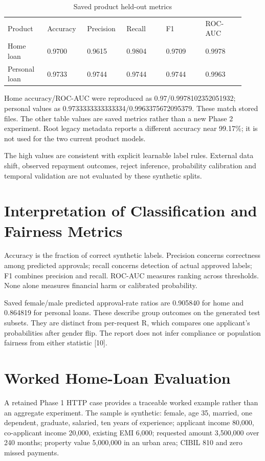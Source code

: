 \documentclass[12pt,a4paper]{report}
\begin{document}
\begin{longtable}{p{0.153\linewidth}p{0.153\linewidth}p{0.153\linewidth}p{0.153\linewidth}p{0.153\linewidth}p{0.153\linewidth}}
\caption{Saved product held-out metrics}\\

Product & Accuracy & Precision & Recall & F1 & ROC-AUC\\
Home loan & 0.9700 & 0.9615 & 0.9804 & 0.9709 & 0.9978\\
Personal loan & 0.9733 & 0.9744 & 0.9744 & 0.9744 & 0.9963\\
\end{longtable}
Home accuracy/ROC-AUC were reproduced as 0.97/0.9978102352051932; personal values as 0.9733333333333334/0.9963375672095379. These match stored files. The other table values are saved metrics rather than a new Phase 2 experiment. Root legacy metadata reports a different accuracy near 99.17\%; it is not used for the two current product models.

The high values are consistent with explicit learnable label rules. External data shift, observed repayment outcomes, reject inference, probability calibration and temporal validation are not evaluated by these synthetic splits.

\section{Interpretation of Classification and Fairness Metrics}
Accuracy is the fraction of correct synthetic labels. Precision concerns correctness among predicted approvals; recall concerns detection of actual approved labels; F1 combines precision and recall. ROC-AUC measures ranking across thresholds. None alone measures financial harm or calibrated probability.

Saved female/male predicted approval-rate ratios are 0.905840 for home and 0.864819 for personal loans. These describe group outcomes on the generated test subsets. They are distinct from per-request R, which compares one applicant's probabilities after gender flip. The report does not infer compliance or population fairness from either statistic [10].

\section{Worked Home-Loan Evaluation}
A retained Phase 1 HTTP case provides a traceable worked example rather than an aggregate experiment. The sample is synthetic: female, age 35, married, one dependent, graduate, salaried, ten years of experience; applicant income 80,000, co-applicant income 20,000, existing EMI 6,000; requested amount 3,500,000 over 240 months; property value 5,000,000 in an urban area; CIBIL 810 and zero missed payments.
\end{document}
